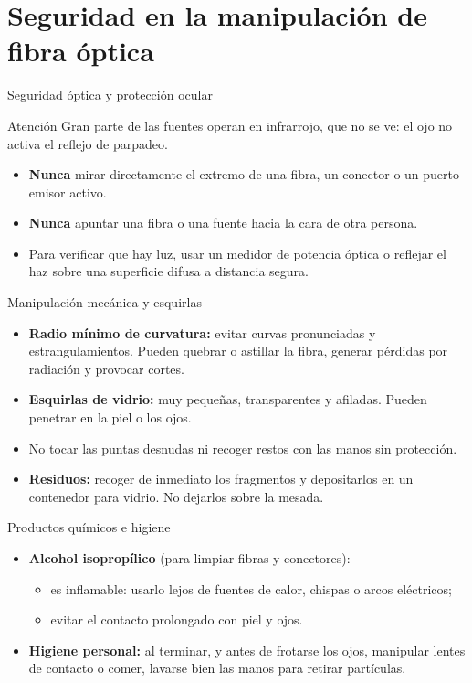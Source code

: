 \documentclass[aspectratio=169,10pt]{beamer}
\begin{document}
\section{Seguridad en la manipulación de fibra óptica}

\begin{frame}{Seguridad óptica y protección ocular}
  \begin{alertblock}{Atención}
    Gran parte de las fuentes operan en {infrarrojo}, que no se ve: el ojo no activa el reflejo de parpadeo.
  \end{alertblock}

  \medskip
  \begin{itemize}
    \item \textbf{Nunca} mirar directamente el extremo de una fibra, un conector o un puerto emisor activo.
    \item \textbf{Nunca} apuntar una fibra o una fuente hacia la cara de otra persona.
    \item Para verificar que hay luz, usar un {medidor de potencia óptica} o reflejar el haz sobre una superficie difusa a distancia segura.
  \end{itemize}
\end{frame}

\begin{frame}{Manipulación mecánica y esquirlas}
  \begin{itemize}
    \item \textbf{Radio mínimo de curvatura:} evitar curvas pronunciadas y estrangulamientos. Pueden quebrar o astillar la fibra, generar pérdidas por radiación y provocar cortes.
    \item \textbf{Esquirlas de vidrio:} muy pequeñas, transparentes y afiladas. Pueden penetrar en la piel o los ojos.
    \item No tocar las puntas desnudas ni recoger restos con las manos sin protección.
    \item \textbf{Residuos:} recoger de inmediato los fragmentos y depositarlos en un contenedor para vidrio. No dejarlos sobre la mesada.
  \end{itemize}
\end{frame}

\begin{frame}{Productos químicos e higiene}
  \begin{itemize}
    \item \textbf{Alcohol isopropílico} (para limpiar fibras y conectores):
      \begin{itemize}
        \item es {inflamable}: usarlo lejos de fuentes de calor, chispas o arcos eléctricos;
        \item evitar el contacto prolongado con piel y ojos.
      \end{itemize}
    \item \textbf{Higiene personal:} al terminar, y antes de frotarse los ojos, manipular lentes de contacto o comer, lavarse bien las manos para retirar partículas.
  \end{itemize}
\end{frame}
\end{document}
